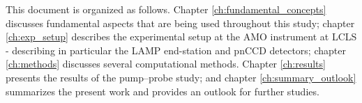 %
This document is organized as follows. Chapter \ref{ch:fundamental_concepts} discusses fundamental aspects that are being used throughout this study; chapter \ref{ch:exp_setup} describes the experimental setup at the AMO instrument at LCLS - describing in particular the LAMP end-station and pnCCD detectors; chapter \ref{ch:methods} discusses several computational methods. Chapter \ref{ch:results} presents the results of the pump--probe study; and chapter \ref{ch:summary_outlook} summarizes the present work and provides an outlook for further studies.
%
%
%